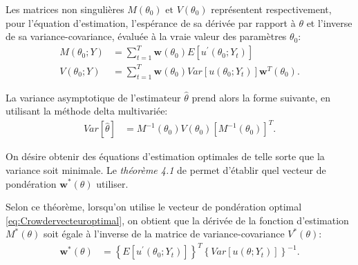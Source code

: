 Les matrices non singulières $M(\theta_0) \mbox{ et } V(\theta_0)$
représentent respectivement, pour l'équation d'estimation, l'espérance
de sa dérivée par rapport à $\theta$ et l'inverse de sa
variance-covariance, évaluée à la vraie valeur des paramètres
$\theta_0$:
\begin{subequations}\label{eq:Crowder86-th3.3-def}
  \begin{align}
    M(\theta_0;Y) &= \sum_{t=1}^{T} \mathbf{w}(\theta_0) E\left[u^{\prime}(\theta_0;Y_t) \right] \label{eq:Crowder86-th3.3-def-1}\\
    V(\theta_0;Y) &= \sum_{t=1}^{T} \mathbf{w}(\theta_0)
    Var\left[u(\theta_0;Y_t)\right]
    \mathbf{w}^{T}(\theta_0)\label{eq:Crowder86-th3.3-def-2}.
  \end{align}
\end{subequations}

La variance asymptotique de l'estimateur $\hat\theta$ prend alors la
forme suivante, en utilisant la méthode delta multivariée:
\begin{align}
  \label{eq:VarAsymptEstEE}
  Var\left[\hat\theta\right] &=
  M^{-1}(\theta_0)V(\theta_0)\left[M^{-1}(\theta_0)\right]^{T}.
\end{align}

On désire obtenir des équations d'estimation optimales de telle sorte
que la variance soit minimale. Le \emph{théorème 4.1} de
\cite{crowder1986consistency} permet d'établir quel vecteur de
pondération $\mathbf{w}^{*}(\theta)$ utiliser.

Selon ce théorème, lorsqu'on utilise le vecteur de pondération optimal
\eqref{eq:Crowdervecteuroptimal}, on obtient que la dérivée de la
fonction d'estimation $M^{*}(\theta)$ soit égale à l'inverse de la
matrice de variance-covariance $V^{*}(\theta)$:
\begin{align}
  \label{eq:Crowdervecteuroptimal}
  \mathbf{w}^{*}(\theta) &= \left\{E \left[u^{\prime}(\theta_0;Y_t)
    \right]\right\}^{T}\left\{Var\left[u(\theta;Y_t)\right]
  \right\}^{-1}.
\end{align}

